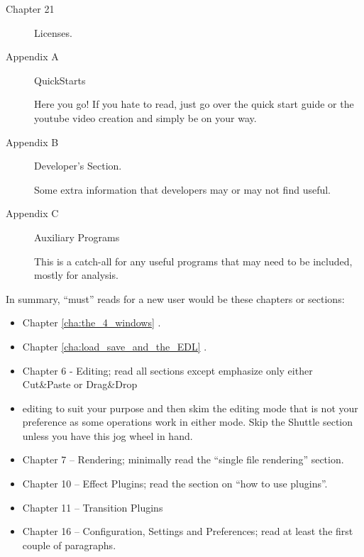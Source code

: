 \begin{description}
    \item[Chapter 21] Licenses.

    \item[Appendix A] QuickStarts

        Here you go! If you hate to read, just go over the quick start guide or the youtube video creation and simply be on your way.

    \item[Appendix B] Developer’s Section.

        Some extra information that developers may or may not find useful.

    \item[Appendix C] Auxiliary Programs

        This is a catch-all for any useful programs that may need to be included, mostly for analysis.

\end{description}

In summary, “must” reads for a new user would be these chapters or sections:

\begin{itemize}
    \item Chapter \ref{cha:the_4_windows} .
    \item Chapter \ref{cha:load_save_and_the_EDL} .
    \item Chapter 6 - Editing; read all sections except emphasize only either Cut\&Paste or Drag\&Drop

    \item editing to suit your purpose and then skim the editing mode that is not your preference as some operations work in either mode. Skip the Shuttle section unless you have this jog wheel in hand.
    \item Chapter 7 – Rendering; minimally read the “single file rendering” section.
    \item Chapter 10 – Effect Plugins; read the section on “how to use plugins”.
    \item Chapter 11 – Transition Plugins
    \item Chapter 16 – Configuration, Settings and Preferences; read at least the first couple of paragraphs.
\end{itemize}



